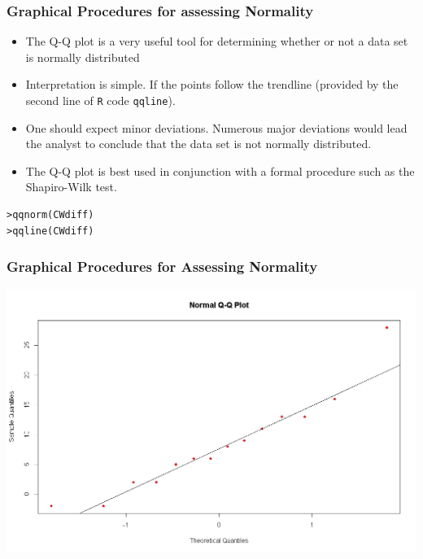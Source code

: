 \documentclass[a4]{beamer}
\begin{document}
\begin{frame}[fragile]
\frametitle{Graphical Procedures for assessing Normality}

\begin{itemize}
\item The Q-Q plot is a very useful tool for determining whether or not a data set is normally distributed
\item Interpretation is simple. If the points follow the trendline (provided by the second line of \texttt{R} code \texttt{qqline}).
\item One should expect minor deviations. Numerous major deviations would lead the analyst to conclude that the data set is not normally distributed.
\item The Q-Q plot is best used in conjunction with a formal procedure such as the Shapiro-Wilk test.
\end{itemize}

\begin{verbatim}
>qqnorm(CWdiff)
>qqline(CWdiff)
\end{verbatim}

\end{frame}


\begin{frame}
\frametitle{Graphical Procedures for Assessing Normality}

\begin{center}
\includegraphics[scale=0.32]{10AQQplot}
\end{center}
\end{frame}
\end{document}
